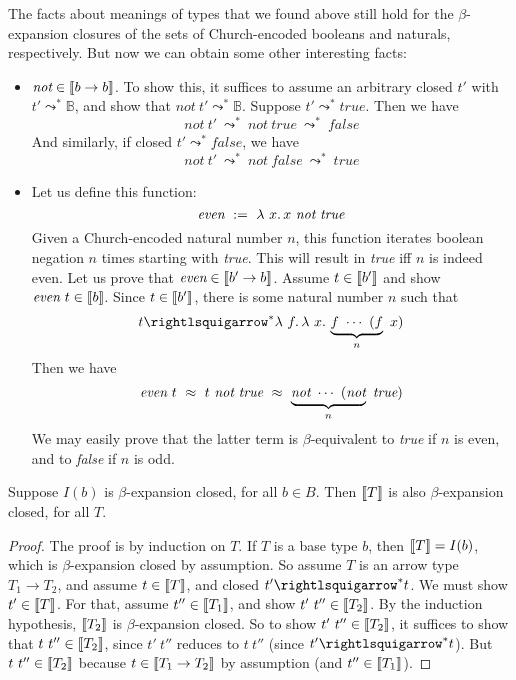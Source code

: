 The facts about meanings of types that we found above still hold for the
$\beta$-expansion closures of the sets of Church-encoded booleans and naturals,
respectively.  But now we can obtain some other interesting facts:
\begin{itemize}
\item $\textit{not}\in\llbracket b\to b \rrbracket$.  To show this, it suffices to
  assume an arbitrary closed $t'$ with $t'\leadsto^*\mathbb{B}$, and show
  that $\textit{not}\ t'\leadsto^*\mathbb{B}$. Suppose $t'\leadsto^*\textit{true}$.
  Then we have
  \[
  \textit{not}\ t' \ \leadsto^*\  \textit{not}\ \textit{true}\ \leadsto^*\ \textit{false}
  \]
  \noindent And similarly, if closed $t'\leadsto^*\textit{false}$, we have
  \[
  \textit{not}\ t' \ \leadsto^*\  \textit{not}\ \textit{false}\ \leadsto^*\ \textit{true}
  \]

\item Let us define this function:
  \[
  \textit{even}\ :=\ \lam{x}{x\ \textit{not}\ \textit{true}}
  \]
  \noindent Given a Church-encoded natural number $n$, this function iterates boolean negation
  $n$ times starting with \textit{true}.  This will result in \textit{true} iff $n$ is indeed even.
  Let us prove that $\textit{even} \in \llbracket b' \to b \rrbracket$.  Assume $t\in\llbracket b' \rrbracket$ and show $\textit{even}\ t \in \llbracket b \rrbracket$.
  Since $t\in\llbracket b' \rrbracket$, there is some natural number $n$ such that
  \[
  t \betaa^* \lam{f}{\lam{x}{\underbrace{f\ \cdots\ (f}_n\ x)}}
  \]
  \noindent Then we have
  \[
  \textit{even}\ t\ \betaeq\ t\ \textit{not}\ \textit{true}\ \betaeq\ \underbrace{\textit{not}\ \cdots\ (\textit{not}}_n\ \textit{true})
  \]
  \noindent We may easily prove that the latter term is $\beta$-equivalent to \textit{true} if $n$ is even, and to \textit{false} if $n$ is odd.

\end{itemize}

\begin{lemma}
\label{lem:betaexpclosed}
  Suppose $I(b)$ is $\beta$-expansion closed, for all $b\in B$. Then $\llbracket T \rrbracket$ is also $\beta$-expansion closed,
  for all $T$.
\end{lemma}
\begin{proof}
  The proof is by induction on $T$.  If $T$ is a base type $b$, then
  $\llbracket T \rrbracket = I(b)$, which is $\beta$-expansion closed by
  assumption.  So assume $T$ is an arrow type $T_1 \to T_2$, and
  assume $t\in\llbracket T \rrbracket$, and closed $t'\betaa^* t$.  We must show
  $t'\in\llbracket T \rrbracket$.  For that, assume $t''\in\llbracket T_1 \rrbracket$, and show
  $t'\ t''\in\interp{T_2}$.  By the induction hypothesis, $\llbracket T_2 \rrbracket$
  is $\beta$-expansion closed.  So to show $t'\ t''\in\interp{T_2}$,
  it suffices to show that $t\ t''\in\llbracket T_2 \rrbracket$, since $t'\ t''$
  reduces to $t\ t''$ (since $t'\betaa^* t$).  But $t\ t''\in\llbracket T_2 \rrbracket$
  because $t\in\llbracket T_1\to T_2 \rrbracket$ by assumption (and $t''\in\llbracket T_1 \rrbracket$).
  \end{proof}

